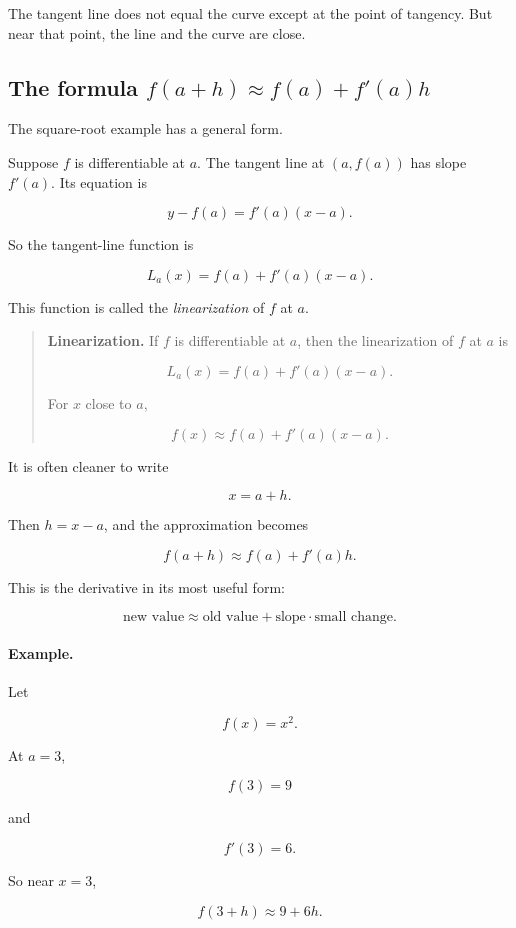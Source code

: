 The tangent line does not equal the curve except at the point of tangency.  But near that point, the line and the curve are close.

\subsection{The formula \(f(a+h)\approx f(a)+f'(a)h\)}
\label{subsec:local-linear-formula}

The square-root example has a general form.

Suppose \(f\) is differentiable at \(a\).  The tangent line at \((a,f(a))\) has slope \(f'(a)\).  Its equation is

\[
y-f(a)=f'(a)(x-a).
\]

So the tangent-line function is

\[
L_a(x)=f(a)+f'(a)(x-a).
\]

This function is called the \emph{linearization} of \(f\) at \(a\).

\begin{quote}
\textbf{Linearization.}
If \(f\) is differentiable at \(a\), then the linearization of \(f\) at \(a\) is

\[
\boxed{
L_a(x)=f(a)+f'(a)(x-a).
}
\]

For \(x\) close to \(a\),

\[
\boxed{
f(x)\approx f(a)+f'(a)(x-a).
}
\]
\end{quote}

It is often cleaner to write

\[
x=a+h.
\]

Then \(h=x-a\), and the approximation becomes

\[
\boxed{
f(a+h)\approx f(a)+f'(a)h.
}
\]

This is the derivative in its most useful form:

\[
\text{new value} \approx \text{old value} + \text{slope}\cdot\text{small change}.
\]

\paragraph{Example.}
Let

\[
f(x)=x^2.
\]

At \(a=3\),

\[
f(3)=9
\]

and

\[
f'(3)=6.
\]

So near \(x=3\),

\[
f(3+h)\approx 9+6h.
\]

